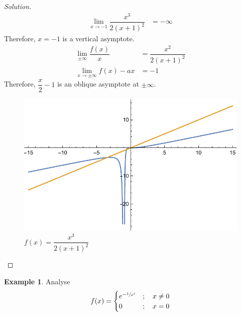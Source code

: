 \documentclass[fleqn, 12pt]{article}
\theoremstyle{definition}
\newtheorem{example}{Example}
\theoremstyle{theorem}
\newenvironment{solution}
{\begin{proof}[Solution]\let\qed\relax}
	{\end{proof}}
\begin{document}
\begin{solution}
	\begin{align*}
		\lim\limits_{x \to -1} \dfrac{x^3}{2 (x + 1)^2} &= -\infty
	\end{align*}
	Therefore, $x = -1$ is a vertical asymptote.
	\begin{align*}
		\lim\limits_{\pm \infty} \dfrac{f(x)}{x} &= \dfrac{x^2}{2 (x + 1)^2}\\
		\lim\limits_{x \to \pm \infty} f(x) - a x &= -1
	\end{align*}
	Therefore, $\dfrac{x}{2} - 1$ is an oblique asymptote at $\pm \infty$.
	\begin{figure}[h]
		\includegraphics{Function1.pdf}
		\caption{$f(x) = \dfrac{x^3}{2(x + 1)^2}$}
	\end{figure}
\end{solution}

\begin{example}
	Analyse
	\begin{equation*}
	f(x) = 
	\begin{cases}
		e^{-\sfrac{1}{x^2}} &;\quad x \neq 0\\
		0 &;\quad x = 0
	\end{cases}
	\end{equation*}
\end{example}
\end{document}
